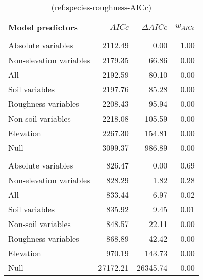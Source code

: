 \begin{table}[!h]

\caption{\label{tab:species-roughness-AICc}(ref:species-roughness-AICc)}
\centering
\begin{tabular}[t]{lrrr}
\toprule
Model predictors & $AICc$ & $\Delta AICc$ & $w_{AICc}$\\
\midrule
\addlinespace[0.3em]
\multicolumn{4}{l}{\textbf{Cape:}}\\
\hspace{1em}Absolute variables & 2112.49 & 0.00 & 1.00\\
\hspace{1em}Non-elevation variables & 2179.35 & 66.86 & 0.00\\
\hspace{1em}All & 2192.59 & 80.10 & 0.00\\
\hspace{1em}Soil variables & 2197.76 & 85.28 & 0.00\\
\hspace{1em}Roughness variables & 2208.43 & 95.94 & 0.00\\
\hspace{1em}Non-soil variables & 2218.08 & 105.59 & 0.00\\
\hspace{1em}Elevation & 2267.30 & 154.81 & 0.00\\
\hspace{1em}Null & 3099.37 & 986.89 & 0.00\\
\addlinespace[0.3em]
\multicolumn{4}{l}{\textbf{SWA:}}\\
\hspace{1em}Absolute variables & 826.47 & 0.00 & 0.69\\
\hspace{1em}Non-elevation variables & 828.29 & 1.82 & 0.28\\
\hspace{1em}All & 833.44 & 6.97 & 0.02\\
\hspace{1em}Soil variables & 835.92 & 9.45 & 0.01\\
\hspace{1em}Non-soil variables & 848.57 & 22.11 & 0.00\\
\hspace{1em}Roughness variables & 868.89 & 42.42 & 0.00\\
\hspace{1em}Elevation & 970.19 & 143.73 & 0.00\\
\hspace{1em}Null & 27172.21 & 26345.74 & 0.00\\

\end{tabular}
\end{table}
